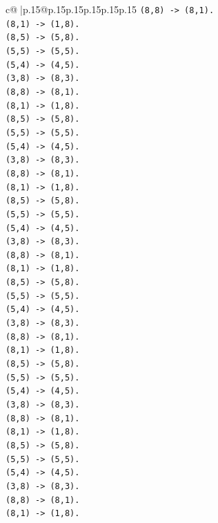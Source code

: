 \documentclass{article}
\begin{document}
{\begin{supertabular}{c@{$\;$}|p{.15\linewidth}@{}p{.15\linewidth}p{.15\linewidth}p{.15\linewidth}p{.15\linewidth}p{.15\linewidth}}
{{{\texttt{(8,8) {-}> (8,1).} \\
\texttt{(8,1) {-}> (1,8).} \\
\texttt{(8,5) {-}> (5,8).} \\
\texttt{(5,5) {-}> (5,5).} \\
\texttt{(5,4) {-}> (4,5).} \\
\texttt{(3,8) {-}> (8,3).} \\
\texttt{(8,8) {-}> (8,1).} \\
\texttt{(8,1) {-}> (1,8).} \\
\texttt{(8,5) {-}> (5,8).} \\
\texttt{(5,5) {-}> (5,5).} \\
\texttt{(5,4) {-}> (4,5).} \\
\texttt{(3,8) {-}> (8,3).} \\
\texttt{(8,8) {-}> (8,1).} \\
\texttt{(8,1) {-}> (1,8).} \\
\texttt{(8,5) {-}> (5,8).} \\
\texttt{(5,5) {-}> (5,5).} \\
\texttt{(5,4) {-}> (4,5).} \\
\texttt{(3,8) {-}> (8,3).} \\
\texttt{(8,8) {-}> (8,1).} \\
\texttt{(8,1) {-}> (1,8).} \\
\texttt{(8,5) {-}> (5,8).} \\
\texttt{(5,5) {-}> (5,5).} \\
\texttt{(5,4) {-}> (4,5).} \\
\texttt{(3,8) {-}> (8,3).} \\
\texttt{(8,8) {-}> (8,1).} \\
\texttt{(8,1) {-}> (1,8).} \\
\texttt{(8,5) {-}> (5,8).} \\
\texttt{(5,5) {-}> (5,5).} \\
\texttt{(5,4) {-}> (4,5).} \\
\texttt{(3,8) {-}> (8,3).} \\
\texttt{(8,8) {-}> (8,1).} \\
\texttt{(8,1) {-}> (1,8).} \\
\texttt{(8,5) {-}> (5,8).} \\
\texttt{(5,5) {-}> (5,5).} \\
\texttt{(5,4) {-}> (4,5).} \\
\texttt{(3,8) {-}> (8,3).} \\
\texttt{(8,8) {-}> (8,1).} \\
\texttt{(8,1) {-}> (1,8).} \\
}}}
\end{supertabular}}
\end{document}
